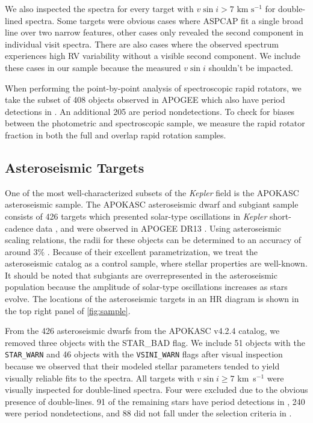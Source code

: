 \documentclass[manuscript]{aastex6}
\newcommand{\vsini}{\ensuremath{v \sin i}}
\newcommand{\Kepler}{\mbox{\textit{Kepler}}}
\newcommand{\kms}{\textrm{ km~s}\ensuremath{^{-1}}}
\newcommand{\STARWARN}{\texttt{STAR\_WARN}}
\newcommand{\VSINIWARN}{\texttt{VSINI\_WARN}}
\begin{document}
We also inspected the spectra for every target with \(\vsini > 7 \kms\)
for double-lined spectra. Some targets were obvious cases where ASPCAP fit a 
single broad line over two narrow features, other cases only revealed the
second component in individual visit spectra. There are
also cases where the observed spectrum experiences high RV variability
without a visible second component. We include these cases in our sample
because the measured \vsini{} shouldn't be impacted.

When performing the point-by-point analysis of spectroscopic rapid rotators, 
we take the subset of 408 objects
observed in APOGEE which also have period detections in \citet{McQuillan14}.
An additional 205 are period nondetections. To check for biases between the
photometric and spectroscopic sample, we measure the rapid rotator fraction in
both the full and overlap rapid rotation samples.

\subsection{Asteroseismic Targets}

One of the most well-characterized subsets of the \Kepler{} field is the
APOKASC asteroseismic sample. The APOKASC asteroseismic dwarf and subgiant 
sample consists of 426 targets which presented solar-type oscillations in 
\Kepler{} short-cadence data \citep{Chaplin11}, and were observed in APOGEE DR13
\citep{Majewski17}. Using asteroseismic scaling relations, the radii
for these objects can be determined to an accuracy of around 3\%
\citep{Serenelli17}. Because of their excellent parametrization, we treat the
asteroseismic catalog as a control sample, where stellar properties are
well-known. It should be noted that subgiants are overrepresented in
the asteroseismic population because the amplitude of solar-type oscillations 
increases as stars evolve. The locations of the asteroseismic targets in an HR
diagram is shown in the top right panel of \cref{fig:sample}.

From the 426 asteroseismic dwarfs from the APOKASC v4.2.4 catalog, we removed 
three objects with the STAR\_BAD flag. We include 51 objects with 
the \STARWARN{} and 46 objects with the \VSINIWARN{} flags after visual 
inspection because we observed that their modeled stellar parameters tended to
yield visually reliable fits to the spectra.  All targets with \(\vsini \ge
7\) \kms{} were visually
inspected for double-lined spectra. Four were excluded due to the obvious
presence of double-lines. 91 of the remaining stars have period detections in 
\citet{McQuillan14}, 240 were period nondetections, and 88 did not fall under 
the selection criteria in \citet{McQuillan14}. 
\end{document}
